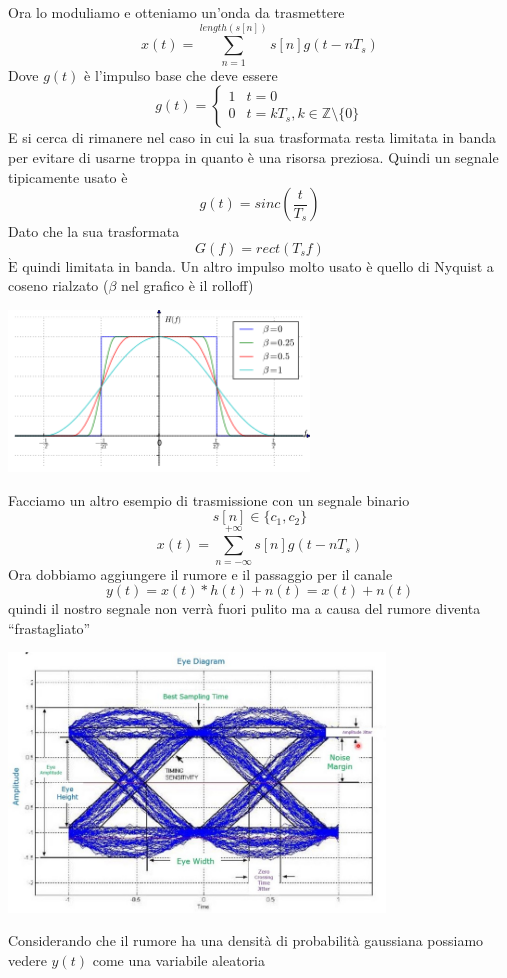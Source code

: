\documentclass{article}
\newcommand{\Eaccentata}{$\grave{\text{E}}$ }
\newcommand{\vopen}{``}
\newcommand{\vclose}{''}
\begin{document}
Ora lo moduliamo e otteniamo un'onda da trasmettere
\[x(t)=\sum_{n=1}^{length(s[n])}s[n]g(t-nT_s)\]
Dove \(g(t)\) è l'impulso base che deve essere
\[g(t)=\begin{cases}
    1&t=0\\
    0&t=kT_s,k\in\mathbb{Z}\setminus\{0\}
\end{cases}\]
E si cerca di rimanere nel caso in cui la sua trasformata resta limitata in banda per evitare di usarne troppa in quanto è una risorsa preziosa. Quindi un segnale tipicamente usato è
\[g(t)=sinc\left(\frac{t}{T_s}\right)\]
Dato che la sua trasformata
\[G(f)=rect(T_s f)\]
\Eaccentata quindi limitata in banda. Un altro impulso molto usato è quello di Nyquist a coseno rialzato (\(\beta\) nel grafico è il rolloff)
\begin{center}
    \includegraphics[width=8cm]{images/impulso di nyquist.png}
\end{center}
Facciamo un altro esempio di trasmissione con un segnale binario
\[s[n]\in\{c_1,c_2\}\]
\[x(t)=\sum_{n=-\infty}^{+\infty}s[n]g(t-nT_s)\]
Ora dobbiamo aggiungere il rumore e il passaggio per il canale
\[y(t)=x(t)*h(t)+n(t)=x(t)+n(t)\]
quindi il nostro segnale non verrà fuori pulito ma a causa del rumore diventa \vopen frastagliato\vclose\space
\begin{center}
    \includegraphics[width=10cm]{images/eye diagram noise.jpg}
\end{center}
Considerando che il rumore ha una densità di probabilità gaussiana possiamo vedere \(y(t)\) come una variabile aleatoria
\end{document}

